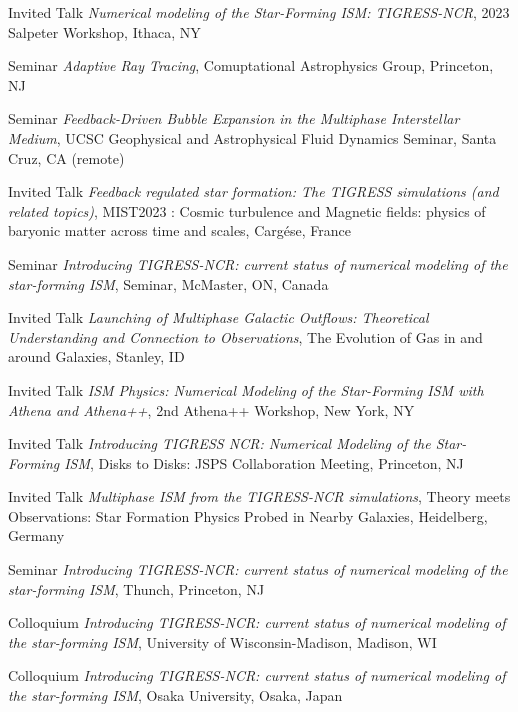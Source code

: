 \documentclass[12pt]{article}
\begin{document}
{Invited Talk}
{\emph{Numerical modeling of the Star-Forming ISM: TIGRESS-NCR},
2023 Salpeter Workshop,
Ithaca, NY}

{Seminar}
{\emph{Adaptive Ray Tracing},
Comuptational Astrophysics Group,
Princeton, NJ}

{Seminar}
{\emph{Feedback-Driven Bubble Expansion in the Multiphase Interstellar Medium},
UCSC Geophysical and Astrophysical Fluid Dynamics Seminar,
Santa Cruz, CA (remote)}

{Invited Talk}
{\emph{Feedback regulated star formation: The TIGRESS simulations (and related topics)},
MIST2023 : Cosmic turbulence and Magnetic fields: physics of baryonic matter across time and scales,
Carg\'ese, France}

{Seminar}
{\emph{Introducing TIGRESS-NCR: current status of numerical modeling of the star-forming ISM},
Seminar,
McMaster, ON, Canada}

{Invited Talk}
{\emph{Launching of Multiphase Galactic Outflows: Theoretical Understanding and Connection to Observations},
The Evolution of Gas in and around Galaxies,
Stanley, ID}

{Invited Talk}
{\emph{ISM Physics: Numerical Modeling of the Star-Forming ISM with Athena and Athena++},
2nd Athena++ Workshop,
New York, NY}

{Invited Talk}
{\emph{Introducing TIGRESS NCR: Numerical Modeling of the Star-Forming ISM},
Disks to Disks: JSPS Collaboration Meeting,
Princeton, NJ}

{Invited Talk}
{\emph{Multiphase ISM from the TIGRESS-NCR simulations},
Theory meets Observations: Star Formation Physics Probed in Nearby Galaxies,
Heidelberg, Germany}

{Seminar}
{\emph{Introducing TIGRESS-NCR: current status of numerical modeling of the star-forming ISM},
Thunch,
Princeton, NJ}

{Colloquium}
{\emph{Introducing TIGRESS-NCR: current status of numerical modeling of the star-forming ISM},
University of Wisconsin-Madison,
Madison, WI}

{Colloquium}
{\emph{Introducing TIGRESS-NCR: current status of numerical modeling of the star-forming ISM},
Osaka University,
Osaka, Japan}
\end{document}
